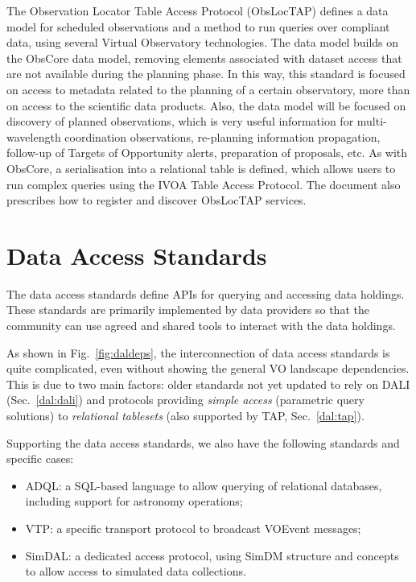 \documentclass[11pt,letter]{ivoa}
\begin{document}
The Observation Locator Table Access Protocol (ObsLocTAP)
\citep{2021ivoa.spec.0724S}
defines a data model for scheduled observations 
and a method to run queries over compliant data, using several Virtual
Observatory technologies.
The data model builds on the ObsCore data model, removing elements
associated with dataset
access that are not available during the planning phase. In this way,
this standard is focused
on access to metadata related to the planning of a certain observatory,
more than on access to
the scientific data products. Also, the data model will be focused on
discovery of planned
observations, which is very useful information for multi-wavelength
coordination observations,
re-planning information propagation, follow-up of Targets of Opportunity
alerts, preparation
of proposals, etc. As with ObsCore, a serialisation into a relational
table is defined, which
allows users to run complex queries using the IVOA Table Access
Protocol. The document also
prescribes how to register and discover ObsLocTAP services. 

\section{Data Access Standards}
\label{dal}

The data access standards define APIs for querying and accessing data
holdings.
These standards are primarily implemented by data providers so that the
community
can use agreed and shared tools to interact with the data holdings.

As shown in Fig.~\ref{fig:daldeps}, the interconnection of data
access standards is quite complicated, even without showing the general
VO landscape
dependencies. This is due to two main
factors: older standards not yet updated to rely on DALI
(Sec.~\ref{dal:dali})
and protocols providing \textit{simple access} (parametric query
solutions) to
\textit{relational tablesets} (also supported by TAP,
Sec.~\ref{dal:tap}).

Supporting the data access standards, we also have the following
standards and specific cases:
\begin{itemize}
\item ADQL: a SQL-based language to allow querying of relational
databases, including support for astronomy operations;
	\item VTP: a specific transport protocol to broadcast VOEvent
messages;
	\item SimDAL: a dedicated access protocol, using SimDM structure and
concepts to allow access to simulated data collections.
\end{itemize}
\end{document}
